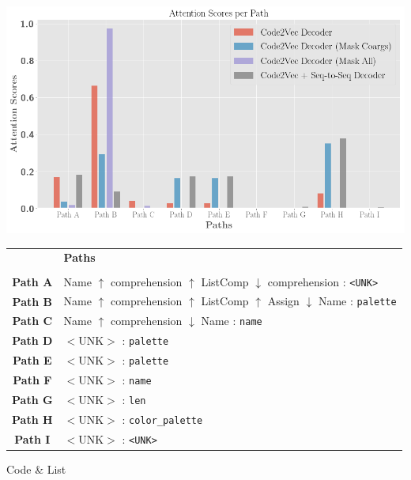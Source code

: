 \begin{listing}[ht!]
\begin{center}

\includegraphics[width=0.9\linewidth]{ImagesCodeRelated/pretty_attention_XKCD.png}
\begingroup
    \fontsize{10pt}{12pt}\selectfont
\begin{tabular}{c l}
    & \textbf{Paths} \\
    \\
    \textbf{Path A} & Name $\uparrow$ comprehension $\uparrow$ ListComp $\downarrow$ comprehension : \texttt{<UNK>} \\
    \textbf{Path B} & Name $\uparrow$ comprehension $\uparrow$ ListComp $\uparrow$ Assign $\downarrow$ Name : \texttt{palette} \\
    \textbf{Path C} & Name $\uparrow$ comprehension $\downarrow$ Name : \texttt{name} \\
    \textbf{Path D} & $<$UNK$>$ : \texttt{palette} \\
    \textbf{Path E} & $<$UNK$>$ : \texttt{palette} \\
    \textbf{Path F} & $<$UNK$>$ : \texttt{name} \\
    \textbf{Path G} & $<$UNK$>$ : \texttt{len} \\
    \textbf{Path H} & $<$UNK$>$ : \texttt{color_palette} \\
    \textbf{Path I} & $<$UNK$>$ : \texttt{<UNK>} \\
\end{tabular}
\endgroup


\end{center}
\caption{Code \& List}
\label{fig:single_examples}
\end{listing}




